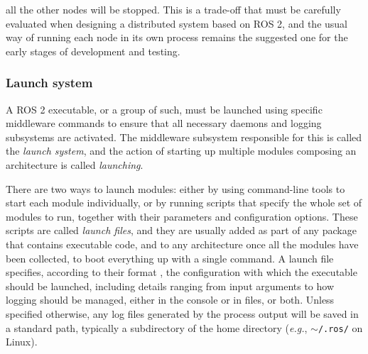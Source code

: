 all the other nodes will be stopped. This is a trade-off that must be carefully evaluated when designing a distributed system based on ROS 2, and the usual way of running each node in its own process remains the suggested one for the early stages of development and testing.

\subsubsection{Launch system}
\label{sec:ros2_launch}
A ROS 2 executable, or a group of such, must be launched using specific middleware commands to ensure that all necessary daemons and logging subsystems are activated. The middleware subsystem responsible for this is called the \emph{launch system}, and the action of starting up multiple modules composing an architecture is called \emph{launching}.

There are two ways to launch modules: either by using command-line tools to start each module individually, or by running scripts that specify the whole set of modules to run, together with their parameters and configuration options. These scripts are called \emph{launch files}, and they are usually added as part of any package that contains executable code, and to any architecture once all the modules have been collected, to boot everything up with a single command. A launch file specifies, according to their format \cite{open_robotics_launch_nodate}, the configuration with which the executable should be launched, including details ranging from input arguments to how logging should be managed, either in the console or in files, or both. Unless specified otherwise, any log files generated by the process output will be saved in a standard path, typically a subdirectory of the home directory (\emph{e.g.}, \texttt{$\sim$/.ros/} on Linux).

